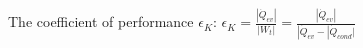 The coefficient of performance \( \epsilon_K \):  
\( \epsilon_K = \frac{|\dot{Q}_{ev}|}{|W_t|} = \frac{|\dot{Q}_{ev}|}{|\dot{Q}_{ev} - |\dot{Q}_{cond}|} \)